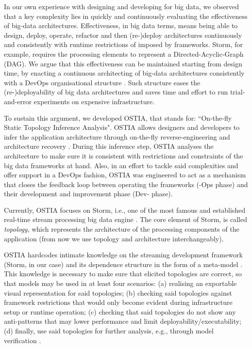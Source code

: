 In our own experience with designing and developing for big data, we observed that a key complexity lies in quickly and continuously evaluating the effectiveness of big-data architectures. Effectiveness, in big data terms, means being able to design, deploy, operate, refactor and then (re-)deploy architectures continuously and consistently with runtime restrictions of imposed by frameworks. Storm, for example, requires the processing elements to represent a Directed-Acyclic-Graph (DAG).
We argue that this effectiveness can be maintained starting from design time, by enacting a continuous architecting of big-data architectures consistently with a DevOps organisational structure \cite{ossslr,devops}. Such structure eases the (re-)deployability of big data architectures and saves time and effort to run trial-and-error experiments on expensive infrastructure.

To sustain this argument, we developed OSTIA, that stands for: ``On-the-fly Static Topology Inference Analysis". OSTIA allows designers and developers to infer the application architecture through on-the-fly reverse-engineering and architecture recovery \cite{archrec}. During this inference step, OSTIA analyses the architecture to make sure it is consistent with restrictions and constraints of the big data frameworks at hand. Also, in an effort to tackle said complexities and offer support in a DevOps fashion, OSTIA was engineered to act as a mechanism that closes the feedback loop between operating the frameworks (-Ops phase) and their development and improvement phase (Dev- phase).

Currently, OSTIA focuses on Storm, i.e., one of the most famous and established real-time stream processing big data engine \cite{storm, toshniwal2014storm}. The core element of Storm, is called \emph{topology}, which represents the architecture of the processing components of the application (from now we use topology and architecture interchangeably).

OSTIA hardcodes intimate knowledge on the streaming development framework (Storm, in our case) and its dependence structure in the form of a meta-model \cite{mda}. This knowledge is necessary to make sure that elicited topologies are correct, so that models may be used in at least four scenarios: (a) realising an exportable visual representation for said topologies; (b) checking said topologies against framework restrictions that would only become evident during infrastructure setup or runtime operation; (c) checking that said topologies do not show any anti-patterns \cite{patternoriented2000} that may lower performance and limit deployability/executability; (d) finally, use said topologies for further analysis, e.g., through model verification \cite{icsoft}.

